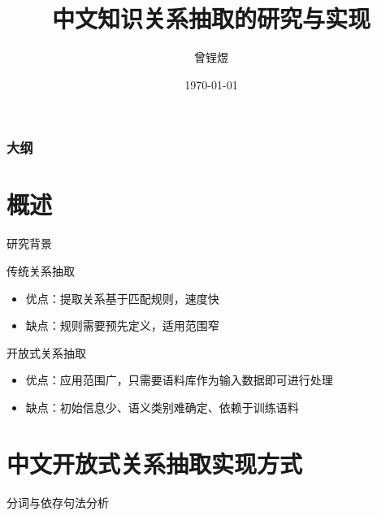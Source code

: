 ﻿\documentclass[12pt]{ctexbeamer}	%
\title{中文知识关系抽取的研究与实现}	%
\author[曾锃煜]{曾锃煜}
\institute[中国科学技术大学]{中国科学技术大学，计算机科学与技术系}	%
\date{\today}
\begin{document}
\begin{frame}
\titlepage
\end{frame}


\begin{frame}
\frametitle{大纲}
\tableofcontents
\end{frame}


\section{概述}

\begin{frame}{研究背景}
  \begin{block}{传统关系抽取}
    \begin{itemize}
      \item 优点：提取关系基于匹配规则，速度快
      \item 缺点：规则需要预先定义，适用范围窄
    \end{itemize}
  \end{block}
  \pause
  \begin{block}{开放式关系抽取}
    \begin{itemize}
      \item 优点：应用范围广，只需要语料库作为输入数据即可进行处理
      \item 缺点：初始信息少、语义类别难确定、依赖于训练语料
    \end{itemize}
  \end{block}
\end{frame}


\section{中文开放式关系抽取实现方式}

\begin{frame}{分词与依存句法分析}
\end{frame}
\end{document}
